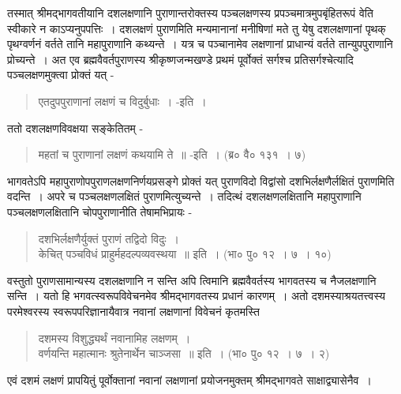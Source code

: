 {तस्मात् श्रीमद्भागवतीयानि दशलक्षणानि पुराणान्तरोक्तस्य पञ्चलक्षणस्य प्रपञ्चमात्रमुपबृंहितरूपं वेति स्वीकारे न काऽप्यनुपपत्तिः~। दशलक्षणं पुराणमिति मन्यमानानां मनीषिणां मते तु येषु दशलक्षणानां पृथक् पृथग्वर्णनं वर्तते तानि महापुराणानि कथ्यन्ते~। यत्र च पञ्चानामेव लक्षणानां प्राधान्यं वर्तते तान्युपपुराणानि प्रोच्यन्ते~। अत एव ब्रह्मवैवर्तपुराणस्य श्रीकृष्णजन्मखण्डे प्रथमं पूर्वोक्तं सर्गश्च प्रतिसर्गश्चेत्यादि पञ्चलक्षणमुक्त्वा प्रोक्तं यत् -
\begin{verse}
एतदुपपुराणानां लक्षणं च विदुर्बुधाः~। -इति~। 
\end{verse}
ततो दशलक्षणविवक्षया सङ्केतितम् -
\begin{verse}
महतां च पुराणानां लक्षणं कथयामि ते~॥ -इति~। (ब्र० वै० १३१~। ७)
\end{verse}
भागवतेऽपि महापुराणोपपुराणलक्षणनिर्णयप्रसङ्गे प्रोक्तं यत् पुराणविदो विद्वांसो दशभिर्लक्षणैर्लक्षितं पुराणमिति वदन्ति~। अपरे च पञ्चलक्षणलक्षितं पुराणमित्युच्यन्ते~। तदित्थं दशलक्षणलक्षितानि महापुराणानि पञ्चलक्षणलक्षितानि चोपपुराणानीति तेषामभिप्रायः -
\begin{verse}
दशभिर्लक्षणैर्युक्तं पुराणं तद्विदो विदुः~। \\
केचित् पञ्चविधं प्राहुर्महदल्पव्यवस्थया~॥ इति~। (भा० पु० १२~। ७~। १०)
\end{verse}
वस्तुतो पुराणसामान्यस्य दशलक्षणानि न सन्ति अपि त्विमानि ब्रह्मवैवर्तस्य भागवतस्य च नैजलक्षणानि सन्ति~। यतो हि भगवत्स्वरूपविवेचनमेव श्रीमद्भागवतस्य प्रधानं कारणम्~। अतो दशमस्याश्रयतत्त्वस्य परमेश्वरस्य स्वरूपपरिज्ञानायैवात्र नवानां लक्षणानां विवेचनं कृतमस्ति 
\begin{verse}
दशमस्य विशुद्ध्यर्थं नवानामिह लक्षणम्~। \\
वर्णयन्ति महात्मानः श्रुतेनार्थेन चाञ्जसा~॥ इति~। (भा० पु० १२~। ७~। २)
\end{verse}
एवं दशमं लक्षणं प्रापयितुं पूर्वोक्तानां नवानां लक्षणानां प्रयोजनमुक्तम् श्रीमद्भागवते साक्षाद्व्यासेनैव~। 

\articleend
}

